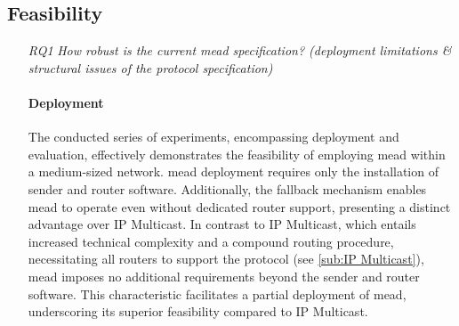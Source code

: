 \subsection{Feasibility} %
\label{sub:discussion_Feasibility}
\begin{itemize}
\item[\textit{RQ1}]
    \textit{How robust is the current \gls{mead} specification? (deployment
        limitations \& structural issues of the protocol specification)}\par
    \paragraph{Deployment}
    The conducted series of experiments, encompassing deployment and evaluation,
        effectively demonstrates the feasibility of employing \gls{mead} within a
        medium-sized network.
        \gls{mead} deployment requires only the installation of sender and router
        software.
        Additionally, the fallback mechanism enables \gls{mead} to operate even
        without dedicated router support, presenting a distinct advantage over
        IP Multicast.
    In contrast to IP Multicast, which entails increased technical complexity
        and a compound routing procedure, necessitating all routers to support
        the protocol (see \autoref{sub:IP Multicast}), \gls{mead} imposes no
        additional requirements beyond the sender and router software.
        This characteristic facilitates a partial deployment of \gls{mead},
        underscoring its superior feasibility compared to IP Multicast.


\end{itemize}
